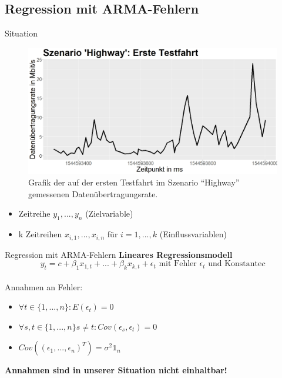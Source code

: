 \subsection{Regression mit ARMA-Fehlern}

\begin{frame}{Situation}
	\begin{figure}[]
		\includegraphics[scale=0.25]{highway_drive_one}
		\caption{Grafik der auf der ersten Testfahrt im Szenario ``Highway'' gemessenen Datenübertragungsrate.}
		\label{highway_drive_one}
	\end{figure}
	
	\begin{itemize}
		\item Zeitreihe $y_1,...,y_n$ (Zielvariable)
		\item k Zeitreihen $x_{i,1},...,x_{i,n}$ für $i=1,...,k$ (Einflussvariablen)
	\end{itemize}
\end{frame}

\begin{frame}{Regression mit ARMA-Fehlern}
	\textbf{Lineares Regressionsmodell} \\
	$$y_{t} = c + \beta_1 x_{1,t} + ... + \beta_k x_{k,t} + \epsilon_t \text{ mit Fehler } \epsilon_t \text{ und Konstante}c$$ \\
	Annahmen an Fehler:
	\begin{itemize}
		\item $\forall t \in \{1,...,n\}: E(\epsilon_t) = 0$
		\item $\forall s, t \in \{1,...,n\} s\neq t: Cov(\epsilon_s, \epsilon_t)=0 $
		\item $Cov((\epsilon_1,...,\epsilon_n)^T)=\sigma^2 \mathds{1}_n$
	\end{itemize}
	\textbf{Annahmen sind in unserer Situation nicht einhaltbar!}
\end{frame}

